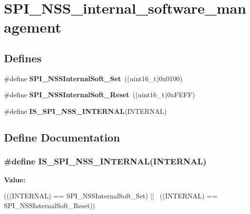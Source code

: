 \hypertarget{group__SPI__NSS__internal__software__management}{
\section{SPI\_\-NSS\_\-internal\_\-software\_\-management}
\label{group__SPI__NSS__internal__software__management}
}
\subsection*{Defines}
\begin{DoxyCompactItemize}
\item 
\hypertarget{group__SPI__NSS__internal__software__management_ga6b2102816167d12140648dba49a192a7}{
\#define {\bfseries SPI\_\-NSSInternalSoft\_\-Set}~((uint16\_\-t)0x0100)}
\label{group__SPI__NSS__internal__software__management_ga6b2102816167d12140648dba49a192a7}

\item 
\hypertarget{group__SPI__NSS__internal__software__management_ga292ec7bc0cd362d61b3b5eed620522c2}{
\#define {\bfseries SPI\_\-NSSInternalSoft\_\-Reset}~((uint16\_\-t)0xFEFF)}
\label{group__SPI__NSS__internal__software__management_ga292ec7bc0cd362d61b3b5eed620522c2}

\item 
\#define {\bfseries IS\_\-SPI\_\-NSS\_\-INTERNAL}(INTERNAL)
\end{DoxyCompactItemize}


\subsection{Define Documentation}
\hypertarget{group__SPI__NSS__internal__software__management_ga7036de442206fb8b365528c115345b36}{
\subsubsection[{IS\_\-SPI\_\-NSS\_\-INTERNAL}]{\setlength{\rightskip}{0pt plus 5cm}\#define IS\_\-SPI\_\-NSS\_\-INTERNAL(INTERNAL)}}
\label{group__SPI__NSS__internal__software__management_ga7036de442206fb8b365528c115345b36}
{\bfseries Value:}
\begin{DoxyCode}
(((INTERNAL) == SPI_NSSInternalSoft_Set) || \
                                       ((INTERNAL) == SPI_NSSInternalSoft_Reset))
      
\end{DoxyCode}
